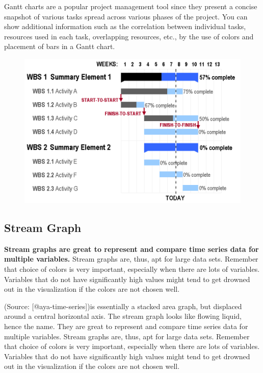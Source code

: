 \documentclass[]{book}
\theoremstyle{definition}
\theoremstyle{definition}
\theoremstyle{definition}
\theoremstyle{remark}
\begin{document}
Gantt charts are a popular project management tool since they present a
concise snapshot of various tasks spread across various phases of the
project. You can show additional information such as the correlation
between individual tasks, resources used in each task, overlapping
resources, etc., by the use of colors and placement of bars in a Gantt
chart.

\begin{figure}
\centering
\includegraphics{images/aya-gantt.png}
\caption{}
\end{figure}

\subsection{Stream Graph}\label{stream-graph}

\textbf{Stream graphs are great to represent and compare time series
data for multiple variables.} Stream graphs are, thus, apt for large
data sets. Remember that choice of colors is very important, especially
when there are lots of variables. Variables that do not have
significantly high values might tend to get drowned out in the
visualization if the colors are not chosen well.

(Source: {[}@aya-time-series{]})is essentially a stacked area graph, but
displaced around a central horizontal axis. The stream graph looks like
flowing liquid, hence the name. They are great to represent and compare
time series data for multiple variables. Stream graphs are, thus, apt
for large data sets. Remember that choice of colors is very important,
especially when there are lots of variables. Variables that do not have
significantly high values might tend to get drowned out in the
visualization if the colors are not chosen well.
\end{document}
